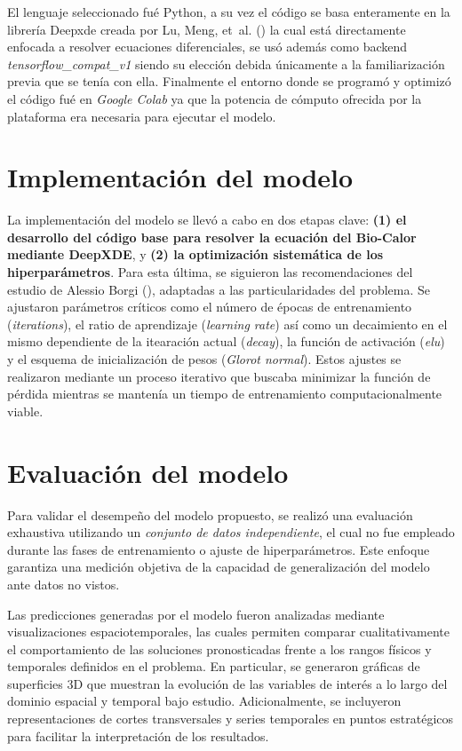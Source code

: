 \documentclass[
  spanish,
  us-letterpaper,
  DIV=11,
  numbers=noendperiod]{scrreprt}
\theoremstyle{definition}
\theoremstyle{plain}
\theoremstyle{remark}
\begin{document}
El lenguaje seleccionado fué Python, a su vez el código se basa
enteramente en la librería Deepxde creada por Lu, Meng, et~al.
() la cual está directamente enfocada a
resolver ecuaciones diferenciales, se usó además como backend
\emph{tensorflow\_compat\_v1} siendo su elección debida únicamente a la
familiarización previa que se tenía con ella. Finalmente el entorno
donde se programó y optimizó el código fué en \emph{Google Colab} ya que
la potencia de cómputo ofrecida por la plataforma era necesaria para
ejecutar el modelo.

\section{Implementación del modelo}\label{implementaciuxf3n-del-modelo}

La implementación del modelo se llevó a cabo en dos etapas clave:
\textbf{(1) el desarrollo del código base para resolver la ecuación del
Bio-Calor mediante DeepXDE}, y \textbf{(2) la optimización sistemática
de los hiperparámetros}. Para esta última, se siguieron las
recomendaciones del estudio de Alessio Borgi
(), adaptadas a las particularidades del
problema. Se ajustaron parámetros críticos como el número de épocas de
entrenamiento (\emph{iterations}), el ratio de aprendizaje
(\emph{learning rate}) así como un decaimiento en el mismo dependiente
de la itearación actual (\emph{decay}), la función de activación
(\emph{elu}) y el esquema de inicialización de pesos (\emph{Glorot
normal}). Estos ajustes se realizaron mediante un proceso iterativo que
buscaba minimizar la función de pérdida mientras se mantenía un tiempo
de entrenamiento computacionalmente viable.

\section{Evaluación del modelo}\label{evaluaciuxf3n-del-modelo}

Para validar el desempeño del modelo propuesto, se realizó una
evaluación exhaustiva utilizando un \emph{conjunto de datos
independiente}, el cual no fue empleado durante las fases de
entrenamiento o ajuste de hiperparámetros. Este enfoque garantiza una
medición objetiva de la capacidad de generalización del modelo ante
datos no vistos.

Las predicciones generadas por el modelo fueron analizadas mediante
visualizaciones espaciotemporales, las cuales permiten comparar
cualitativamente el comportamiento de las soluciones pronosticadas
frente a los rangos físicos y temporales definidos en el problema. En
particular, se generaron gráficas de superficies 3D que muestran la
evolución de las variables de interés a lo largo del dominio espacial y
temporal bajo estudio. Adicionalmente, se incluyeron representaciones de
cortes transversales y series temporales en puntos estratégicos para
facilitar la interpretación de los resultados.
\end{document}
